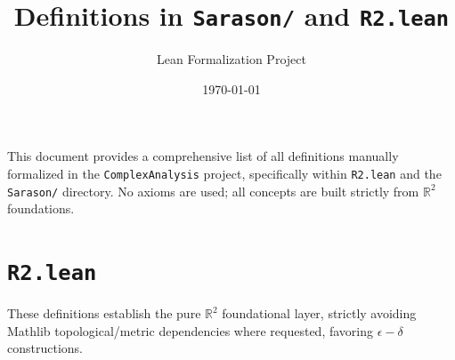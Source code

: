 \documentclass[11pt]{article}
\title{Definitions in \texttt{Sarason/} and \texttt{R2.lean}}
\author{Lean Formalization Project}
\date{\today}
\begin{document}
\maketitle

This document provides a comprehensive list of all definitions manually formalized in the \texttt{ComplexAnalysis} project, specifically within \texttt{R2.lean} and the \texttt{Sarason/} directory. No axioms are used; all concepts are built strictly from $\mathbb{R}^2$ foundations.

\section{\texttt{R2.lean}}

These definitions establish the pure $\mathbb{R}^2$ foundational layer, strictly avoiding Mathlib topological/metric dependencies where requested, favoring $\epsilon-\delta$ constructions.
\end{document}
